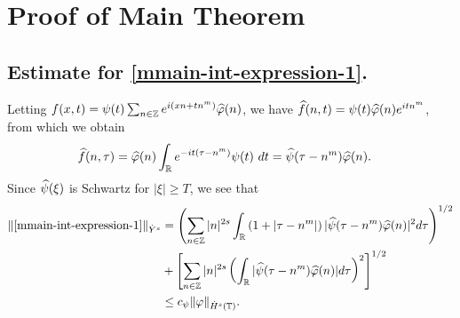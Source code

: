 \section{Proof of Main Theorem}
%
%
%
%
%
%
%
%
%
%
%
\subsection{Estimate for
\texorpdfstring{\ref{mmain-int-expression-1}}{Expression 1}.}
%
%
Letting $f(x,t) = \psi(t) \sum_{n \in \mathbb{Z}} e^{i(xn + tn^m)} 
\widehat{\varphi}(n)$, we have $\widehat{f}(n,t) = \psi(t) \widehat{\varphi}(n) e^{itn^m}$,
from which we obtain
%
%
\begin{equation}
	\label{mfourier-trans-calc}
	\begin{split}
		\widehat{f}(n, \tau)
		& = \widehat{\varphi}(n) \int_{\mathbb{R}} e^{-it( \tau - n^m)} 
		\psi(t) \ d t
		= \widehat{\psi}(\tau - n^m) \widehat{\varphi}(n).
	\end{split}
\end{equation}
%
%
%
%
%
%
Since $\widehat{\psi}(\xi)$ is Schwartz for $|\xi| \ge T$, we see that 
%
%
\begin{equation}
	\begin{split}
	\label{mmain-int1-est}
		\|\eqref{mmain-int-expression-1}\|_{\dot{Y}^s}
		& = \left (  \sum_{n\in \mathbb{Z}} |n|^{2s} \int_{\mathbb{R}} \left( 1 + | \tau - n^m 
		| \right )
		| \widehat{\psi}(\tau - n^m) \widehat{\varphi}(n) |^2 d \tau \right)^{1/2} 
		\\
		& + \left[ \sum_{n \in \mathbb{Z} }| n |^{2s} \left( \int_{\mathbb{R}} |
		\widehat{\psi}(\tau - n^m)\widehat{\varphi}(n) | d \tau
		\right)^{2} \right]^{1/2}
		\\
		& \le c_{\psi}
		\|\varphi\|_{\dot{H}^s(\mathbb{T})}.
	\end{split}
\end{equation}
%
%
%
%
